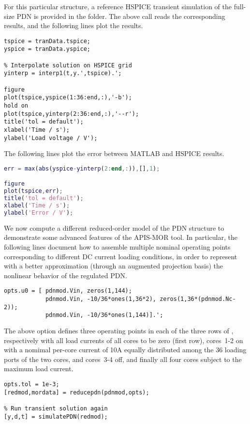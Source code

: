 For this particular structure, a reference HSPICE transient simulation of the full-size PDN is provided in the  folder. The above call reads the corresponding results, and the following lines plot the results.

\begin{lstlisting}[numbers=none]
tspice = tranData.tspice;
yspice = tranData.yspice;

% Interpolate solution on HSPICE grid
yinterp = interp1(t,y.',tspice).';

figure
plot(tspice,yspice(1:36:end,:),'-b');
hold on
plot(tspice,yinterp(2:36:end,:),'--r');
title('tol = default');
xlabel('Time / s');
ylabel('Load voltage / V');
\end{lstlisting}

The following lines plot the error between MATLAB and HSPICE results.

\begin{lstlisting}[language=matlab]
err = max(abs(yspice-yinterp(2:end,:)),[],1);

figure
plot(tspice,err);
title('tol = default');
xlabel('Time / s');
ylabel('Error / V');
\end{lstlisting}

We now compute a different reduced-order model of the PDN structure to demonstrate some advanced features of the APIS-MOR tool. In particular, the following lines document how to assemble multiple nominal operating points corresponding to different DC current loading conditions, in order to represent with a better approximation (through an augmented projection basis) the nonlinear behavior of the regulated PDN.

\begin{lstlisting}[numbers=none]
% Define three operating points
opts.u0 = [ pdnmod.Vin, zeros(1,144); 
            pdnmod.Vin, -10/36*ones(1,36*2), zeros(1,36*(pdnmod.Nc-2));
            pdnmod.Vin, -10/36*ones(1,144)].';
\end{lstlisting}

The above option defines three operating points in each of the three rows of , respectively with all load currents of all cores to be zero (first row), cores~1-2 on with a nomimal per-core current of 10A equally distributed among the 36 loading ports of the two cores, and cores~3-4 off, and finally all four cores subject to the maximum load current.

\begin{lstlisting}[numbers=none]
% Set looser tolerance to 1e-3
opts.tol = 1e-3;
[redmod,mordata] = reducepdn(pdnmod,opts);

% Run transient solution again
[y,d,t] = simulatePDN(redmod);
\end{lstlisting}

